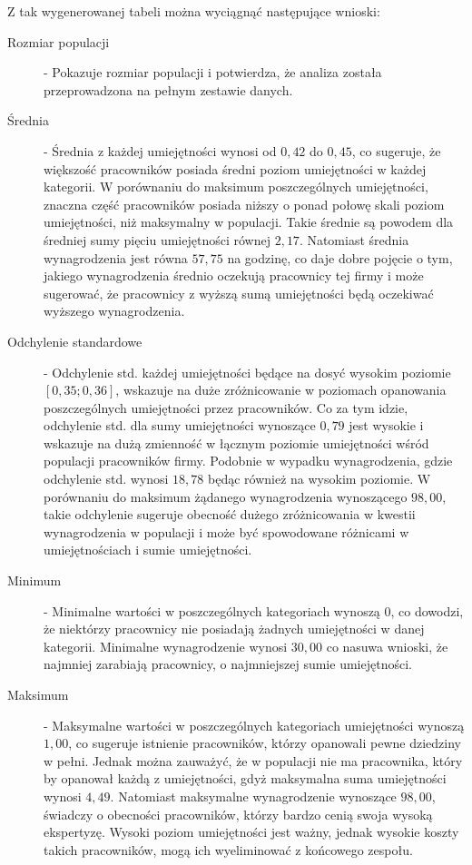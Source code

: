     \par Z tak wygenerowanej tabeli można wyciągnąć następujące wnioski:
    \begin{description}
        \item[Rozmiar populacji\label{itm:count}]  - Pokazuje rozmiar populacji i potwierdza, że analiza została przeprowadzona na pełnym zestawie danych.
        
        \item[Średnia\label{itm:mean}] - Średnia z każdej umiejętności wynosi od $0,42$ do $0,45$, co sugeruje, że większość pracowników posiada średni poziom umiejętności w każdej kategorii. W porównaniu do maksimum poszczególnych umiejętności, znaczna część pracowników posiada niższy o ponad połowę skali poziom umiejętności, niż maksymalny w populacji. Takie średnie są powodem dla średniej sumy pięciu umiejętności równej $2,17$. Natomiast średnia wynagrodzenia jest równa $57,75$ na godzinę, co daje dobre pojęcie o tym, jakiego wynagrodzenia średnio oczekują pracownicy tej firmy i może sugerować, że pracownicy z wyższą sumą umiejętności będą oczekiwać wyższego wynagrodzenia.
        
        \item[Odchylenie standardowe\label{itm:std}] - Odchylenie std. każdej umiejętności będące na dosyć wysokim poziomie $[0,35; 0,36]$, wskazuje na duże zróżnicowanie w poziomach opanowania poszczególnych umiejętności przez pracowników. Co za tym idzie, odchylenie std. dla sumy umiejętności wynoszące $0,79$ jest wysokie  i wskazuje na dużą zmienność w łącznym poziomie umiejętności wśród populacji pracowników firmy. Podobnie w wypadku wynagrodzenia, gdzie odchylenie std. wynosi $18,78$ będąc również na wysokim poziomie. W porównaniu do maksimum żądanego wynagrodzenia wynoszącego $98,00$, takie odchylenie sugeruje obecność dużego zróżnicowania w kwestii wynagrodzenia w populacji i może być spowodowane różnicami w umiejętnościach i sumie umiejętności.
        
        \item[Minimum\label{itm:min}] - Minimalne wartości w poszczególnych kategoriach wynoszą $0$, co dowodzi, że niektórzy pracownicy nie posiadają żadnych umiejętności w danej kategorii. Minimalne wynagrodzenie wynosi $30,00$ co nasuwa wnioski, że najmniej zarabiają pracownicy, o najmniejszej sumie umiejętności.
        
        \item[Maksimum\label{itm:max}] - Maksymalne wartości w poszczególnych kategoriach umiejętności wynoszą $1,00$, co sugeruje istnienie pracowników, którzy opanowali pewne dziedziny w pełni. Jednak można zauważyć, że w populacji nie ma pracownika, który by opanował każdą z umiejętności, gdyż maksymalna suma umiejętności wynosi $4,49$. Natomiast maksymalne wynagrodzenie wynoszące $98,00$, świadczy o obecności pracowników, którzy bardzo cenią swoja wysoką ekspertyzę. Wysoki poziom umiejętności jest ważny, jednak wysokie koszty takich pracowników, mogą ich wyeliminować z końcowego zespołu.
        

\end{description}

